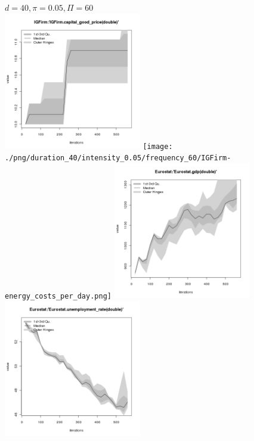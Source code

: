\begin{figure}[ht!]
\centering\leavevmode
\begin{minipage}{13cm}
\centering\leavevmode
{$d=40, \pi=0.05, \Pi=60$}\\
\includegraphics[width=6cm]{./png/duration_40/intensity_0.05/frequency_60/IGFirm-capital_good_price.png}
\texttt{[image: ./png/duration\_40/intensity\_0.05/frequency\_60/IGFirm-energy\_costs\_per\_day.png]}
\includegraphics[width=6cm]{./png/duration_40/intensity_0.05/frequency_60/Eurostat-gdp.png}
\includegraphics[width=6cm]{./png/duration_40/intensity_0.05/frequency_60/Eurostat-unemployment_rate.png}
\end{minipage}
\end{figure}

